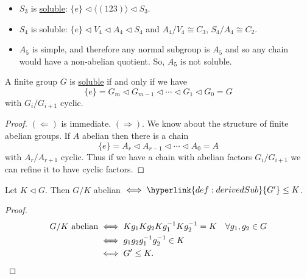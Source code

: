 \documentclass{article}
\begin{document}
\begin{eg}\leavevmode
    \begin{itemize}
        \item $S_3$ is \hyperlink{def:soluble}{soluble}: $\{e\} \lhd \langle (123) \rangle \lhd S_3$.
        \item $S_4$ is soluble: $\{e\} \lhd V_4 \lhd A_4 \lhd S_4$ and $A_4/V_4 \cong C_3$, $S_4 / A_4 \cong C_2$.
        \item $A_5$ is simple, and therefore any normal subgroup is $A_5$ and so any chain would have a non-abelian quotient. So, $A_5$ is not soluble.
    \end{itemize}
\end{eg}
\begin{nlemma}\label{lem:4.16}
    A finite group $G$ is \hyperlink{def:soluble}{soluble} if and only if we have
    \begin{equation*}
        \{e\} = G_m \lhd G_{m-1} \lhd \dotsb \lhd G_1 \lhd G_0 = G
    \end{equation*}
    with $G_i/G_{i+1}$ cyclic.
\end{nlemma}
\begin{proof}
    $(\Leftarrow)$ is immediate.
    $(\Rightarrow)$. We know about the structure of finite abelian groups.
    If $A$ abelian then there is a chain
    \begin{equation*}
        \{e\} = A_r \lhd A_{r-1} \lhd \dotsb \lhd A_0 = A
    \end{equation*}
    with $A_r / A_{r+1}$ cyclic.
    Thus if we have a chain with abelian factors $G_i/G_{i+1}$ we can refine it to have cyclic factors.
\end{proof}
\begin{nlemma}\label{lem:4.18}
    Let $K \lhd G$. Then $G/K$ abelian $\iff \hyperlink{def:derivedSub}{G'} \leq K$.
\end{nlemma}
\begin{proof}
    \begin{align*}
        G/K \text{ abelian} &\iff Kg_1 Kg_2 Kg_1^{-1} K g_2^{-1} = K \quad \forall g_1, g_2 \in G\\
                            &\iff g_1 g_2 g_1^{-1} g_2^{-1} \in K \\
                            &\iff G' \leq K. \qedhere
    \end{align*}\qedhere
\end{proof}
\end{document}
